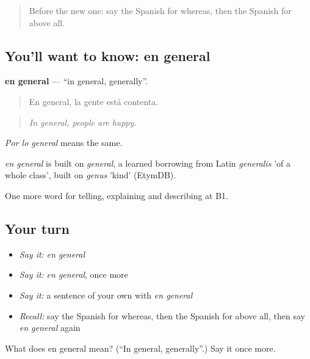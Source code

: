 \label{lesson:ES-C588-en-general}



\begin{quote}
Before the new one: say the Spanish for whereas, then the Spanish for above all.
\end{quote}

\subsection*{You'll want to know: en general}
\textbf{en general} — \textquotedblleft{}in general, generally\textquotedblright{}.

\begin{quote}
En general, la gente está contenta.
\end{quote}

\begin{quote}
\emph{In general, people are happy.}
\end{quote}

\emph{Por lo general} means the same.

\begin{cousinweb}
\emph{en general} is built on \emph{general}, a learned borrowing from Latin \emph{generalis} 'of a whole class', built on \emph{genus} 'kind' (EtymDB).
\end{cousinweb}

\begin{grammarlens}[title={What you've built}]
One more word for telling, explaining and describing at B1.
\end{grammarlens}

\subsection*{Your turn}
\begin{itemize}
\raggedright
  \item \emph{Say it:} \emph{en general}
  \item \emph{Say it:} \emph{en general}, once more
  \item \emph{Say it:} a sentence of your own with \emph{en general}
  \item \emph{Recall:} say the Spanish for whereas, then the Spanish for above all, then say \emph{en general} again
\end{itemize}

\begin{tcolorbox}[breakable,colback=teal!4,colframe=teal!35!black,title={Before you move on}]
What does en general mean? (\textquotedblleft{}In general, generally\textquotedblright{}.) Say it once more.
\end{tcolorbox}
